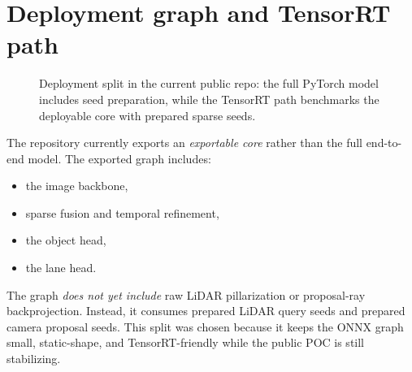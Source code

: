 \documentclass[11pt]{article}
\begin{document}
\section{Deployment graph and TensorRT path}
\begin{figure}[t]
\centering
{}
\caption{Deployment split in the current public repo: the full PyTorch model includes seed preparation, while the TensorRT path benchmarks the deployable core with prepared sparse seeds.}
\label{fig:deploy}
\end{figure}

The repository currently exports an \emph{exportable core} rather than the full end-to-end model. The exported graph includes:
\begin{itemize}
\item the image backbone,
\item sparse fusion and temporal refinement,
\item the object head,
\item the lane head.
\end{itemize}

The graph \emph{does not yet include} raw LiDAR pillarization or proposal-ray backprojection. Instead, it consumes prepared LiDAR query seeds and prepared camera proposal seeds. This split was chosen because it keeps the ONNX graph small, static-shape, and TensorRT-friendly while the public POC is still stabilizing.
\end{document}
